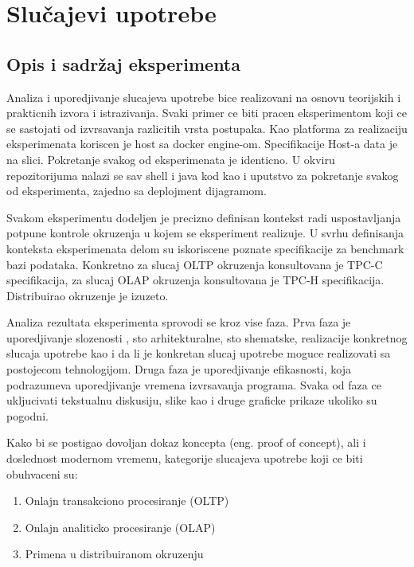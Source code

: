 \documentclass[12pt,oneside]{memoir}
\begin{document}
\chapter{Slučajevi upotrebe}
\section{Opis i sadržaj eksperimenta}
Analiza i uporedjivanje slucajeva upotrebe bice realizovani na osnovu teorijskih i prakticnih  izvora i istrazivanja. Svaki primer ce biti pracen eksperimentom koji ce se sastojati od izvrsavanja razlicitih vrsta postupaka. Kao platforma za realizaciju eksperimenata koriscen je host sa docker engine-om. Specifikacije Host-a data je na slici. Pokretanje svakog od eksperimenata je identicno. U okviru repozitorijuma nalazi se sav shell i java kod kao i uputstvo za pokretanje svakog od eksperimenta, zajedno sa deplojment dijagramom.

Svakom eksperimentu dodeljen je precizno definisan kontekst radi uspostavljanja potpune kontrole okruzenja u kojem se eksperiment realizuje. U svrhu definisanja konteksta eksperimenata delom su iskoriscene poznate specifikacije za benchmark bazi podataka. Konkretno za slucaj OLTP okruzenja konsultovana je TPC-C specifikacija, za slucaj OLAP okruzenja konsultovana je TPC-H specifikacija. Distribuirao okruzenje je izuzeto.

Analiza rezultata eksperimenta sprovodi se kroz vise faza. Prva faza je uporedjivanje slozenosti , sto arhitekturalne, sto shematske, realizacije konkretnog slucaja upotrebe kao i da li je konkretan slucaj upotrebe moguce realizovati sa postojecom tehnologijom. Druga faza je uporedjivanje efikasnosti, koja podrazumeva uporedjivanje vremena izvrsavanja programa.  Svaka od faza ce ukljucivati tekstualnu diskusiju, slike kao i druge graficke prikaze ukoliko su pogodni.

Kako bi se postigao dovoljan dokaz koncepta (eng. proof of concept), ali i doslednost modernom
vremenu, kategorije slucajeva upotrebe koji ce biti obuhvaceni su:
\begin{enumerate}
\item Onlajn transakciono procesiranje (OLTP)
\item Onlajn analiticko procesiranje (OLAP)
\item Primena u distribuiranom okruzenju
\end{enumerate}
\end{document}
